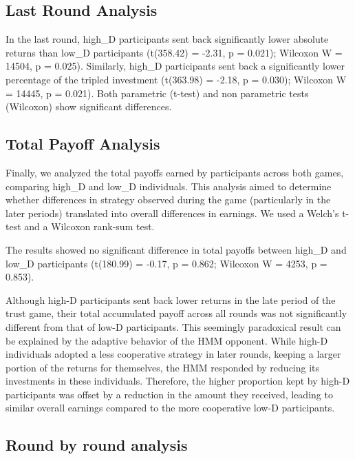 \documentclass[
]{article}
\begin{document}
\subsection{Last Round Analysis}\label{last-round-analysis}

In the last round, high\_D participants sent back significantly lower absolute returns than low\_D participants (t(358.42) = -2.31, p = 0.021); Wilcoxon W = 14504, p = 0.025). Similarly, high\_D participants sent back a significantly lower percentage of the tripled investment (t(363.98) = -2.18, p = 0.030); Wilcoxon W = 14445, p = 0.021). Both parametric (t-test) and non parametric tests (Wilcoxon) show significant differences.

\subsection{Total Payoff Analysis}\label{total-payoff-analysis}

Finally, we analyzed the total payoffs earned by participants across both games, comparing high\_D and low\_D individuals. This analysis aimed to determine whether differences in strategy observed during the game (particularly in the later periods) translated into overall differences in earnings. We used a Welch's t-test and a Wilcoxon rank-sum test.

The results showed no significant difference in total payoffs between high\_D and low\_D participants (t(180.99) = -0.17, p = 0.862; Wilcoxon W = 4253, p = 0.853).

Although high-D participants sent back lower returns in the late period of the trust game, their total accumulated payoff across all rounds was not significantly different from that of low-D participants. This seemingly paradoxical result can be explained by the adaptive behavior of the HMM opponent. While high-D individuals adopted a less cooperative strategy in later rounds, keeping a larger portion of the returns for themselves, the HMM responded by reducing its investments in these individuals. Therefore, the higher proportion kept by high-D participants was offset by a reduction in the amount they received, leading to similar overall earnings compared to the more cooperative low-D participants.

\subsection{Round by round analysis}\label{round-by-round-analysis}
\end{document}
